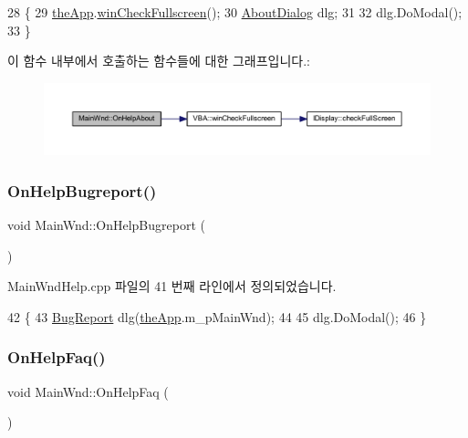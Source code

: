 \begin{DoxyCode}
28 \{
29   \mbox{\hyperlink{_v_b_a_8cpp_a8095a9d06b37a7efe3723f3218ad8fb3}{theApp}}.\mbox{\hyperlink{class_v_b_a_a340eaeeb7fcfc242f08ac3442d991a96}{winCheckFullscreen}}();
30   \mbox{\hyperlink{class_about_dialog}{AboutDialog}} dlg;
31 
32   dlg.DoModal();
33 \}
\end{DoxyCode}
이 함수 내부에서 호출하는 함수들에 대한 그래프입니다.\+:
\nopagebreak
\begin{figure}[H]
\begin{center}
\leavevmode
\includegraphics[width=350pt]{class_main_wnd_a2151b9822f8f20900f98142b3f74d2be_cgraph}
\end{center}
\end{figure}
\mbox{\label{class_main_wnd_aa2ca8cf6faaa7a20d52785029767c50f}} 
\subsubsection{\texorpdfstring{On\+Help\+Bugreport()}{OnHelpBugreport()}}
{\footnotesize\ttfamily void Main\+Wnd\+::\+On\+Help\+Bugreport (\begin{DoxyParamCaption}{ }\end{DoxyParamCaption})\hspace{0.3cm}{\ttfamily [protected]}}



Main\+Wnd\+Help.\+cpp 파일의 41 번째 라인에서 정의되었습니다.


\begin{DoxyCode}
42 \{
43   \mbox{\hyperlink{class_bug_report}{BugReport}} dlg(\mbox{\hyperlink{_v_b_a_8cpp_a8095a9d06b37a7efe3723f3218ad8fb3}{theApp}}.m\_pMainWnd);
44 
45   dlg.DoModal();
46 \}
\end{DoxyCode}
\mbox{\label{class_main_wnd_ad808c9977aa3296be28ded7caad4fe73}} 
\subsubsection{\texorpdfstring{On\+Help\+Faq()}{OnHelpFaq()}}
{\footnotesize\ttfamily void Main\+Wnd\+::\+On\+Help\+Faq (\begin{DoxyParamCaption}{ }\end{DoxyParamCaption})\hspace{0.3cm}{\ttfamily [protected]}}



